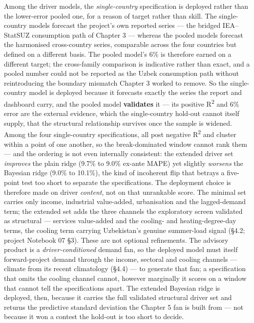 \documentclass[10pt,twocolumn]{article}
\begin{document}
Among the driver models, the \textit{single-country} specification is deployed rather than the lower-error pooled one, for a reason of target rather than skill. The single-country models forecast the project's own reported series --- the bridged IEA--StatSUZ consumption path of Chapter 3 --- whereas the pooled models forecast the harmonised cross-country series, comparable across the four countries but defined on a different basis. The pooled model's 6\% is therefore earned on a different target; the cross-family comparison is indicative rather than exact, and a pooled number could not be reported as the Uzbek consumption path without reintroducing the boundary mismatch Chapter 3 worked to remove. So the single-country model is deployed because it forecasts exactly the series the report and dashboard carry, and the pooled model \textbf{validates} it --- its positive R\textsuperscript{2} and 6\% error are the external evidence, which the single-country hold-out cannot itself supply, that the structural relationship survives once the sample is widened. Among the four single-country specifications, all post negative R\textsuperscript{2} and cluster within a point of one another, so the break-dominated window cannot rank them --- and the ordering is not even internally consistent: the extended driver set \textit{improves} the plain ridge (9.7\% to 9.0\% ex-ante MAPE) yet slightly \textit{worsens} the Bayesian ridge (9.0\% to 10.1\%), the kind of incoherent flip that betrays a five-point test too short to separate the specifications. The deployment choice is therefore made on driver \textit{content}, not on that unrankable score. The minimal set carries only income, industrial value-added, urbanisation and the lagged-demand term; the extended set adds the three channels the exploratory screen validated as structural --- services value-added and the cooling- and heating-degree-day terms, the cooling term carrying Uzbekistan's genuine summer-load signal (\S{}4.2; project Notebook 07 \S{}3). These are not optional refinements. The advisory product is a \textit{driver-conditioned} demand fan, so the deployed model must itself forward-project demand through the income, sectoral and cooling channels --- climate from its recent climatology (\S{}4.4) --- to generate that fan; a specification that omits the cooling channel cannot, however marginally it scores on a window that cannot tell the specifications apart. The extended Bayesian ridge is deployed, then, because it carries the full validated structural driver set and returns the predictive standard deviation the Chapter 5 fan is built from --- not because it won a contest the hold-out is too short to decide.
\end{document}
